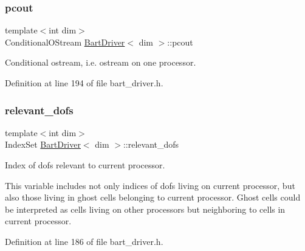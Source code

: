 \mbox{\label{class_bart_driver_ad7bd8e33b7a6e67aa3d31527e40d18ea}} 
\subsubsection{\texorpdfstring{pcout}{pcout}}
{\footnotesize\ttfamily template$<$int dim$>$ \\
Conditional\+O\+Stream \hyperlink{class_bart_driver}{Bart\+Driver}$<$ dim $>$\+::pcout\hspace{0.3cm}{\ttfamily [private]}}



Conditional ostream, i.\+e. ostream on one processor. 



Definition at line 194 of file bart\+\_\+driver.\+h.

\mbox{\label{class_bart_driver_aabb9851e7b41f4a4b9395d79e4653ec7}} 
\subsubsection{\texorpdfstring{relevant\+\_\+dofs}{relevant\_dofs}}
{\footnotesize\ttfamily template$<$int dim$>$ \\
Index\+Set \hyperlink{class_bart_driver}{Bart\+Driver}$<$ dim $>$\+::relevant\+\_\+dofs\hspace{0.3cm}{\ttfamily [private]}}



Index of dofs relevant to current processor. 

This variable includes not only indices of dofs living on current processor, but also those living in ghost cells belonging to current processor. Ghost cells could be interpreted as cells living on other processors but neighboring to cells in current processor. 

Definition at line 186 of file bart\+\_\+driver.\+h.

\mbox{\label{class_bart_driver_a560ae94f3801fb64a35fdbcd0d8a772d}} 
